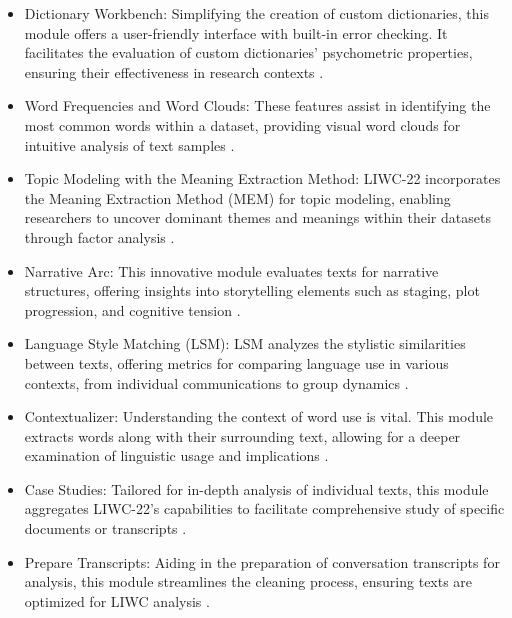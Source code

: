 \begin{itemize}
\item Dictionary Workbench: Simplifying the creation of custom dictionaries, this module offers a user-friendly interface with built-in error checking. It facilitates the evaluation of custom dictionaries' psychometric properties, ensuring their effectiveness in research contexts \cite{boyd2022development}.

\item Word Frequencies and Word Clouds: These features assist in identifying the most common words within a dataset, providing visual word clouds for intuitive analysis of text samples \cite{boyd2022development}.

\item Topic Modeling with the Meaning Extraction Method: LIWC-22 incorporates the Meaning Extraction Method (MEM) for topic modeling, enabling researchers to uncover dominant themes and meanings within their datasets through factor analysis \cite{boyd2022development}.

\item Narrative Arc: This innovative module evaluates texts for narrative structures, offering insights into storytelling elements such as staging, plot progression, and cognitive tension \cite{boyd2022development}.

\item Language Style Matching (LSM): LSM analyzes the stylistic similarities between texts, offering metrics for comparing language use in various contexts, from individual communications to group dynamics \cite{boyd2022development}.

\item Contextualizer: Understanding the context of word use is vital. This module extracts words along with their surrounding text, allowing for a deeper examination of linguistic usage and implications \cite{boyd2022development}.

\item Case Studies: Tailored for in-depth analysis of individual texts, this module aggregates LIWC-22's capabilities to facilitate comprehensive study of specific documents or transcripts \cite{boyd2022development}.

\item Prepare Transcripts: Aiding in the preparation of conversation transcripts for analysis, this module streamlines the cleaning process, ensuring texts are optimized for LIWC analysis \cite{boyd2022development}.
\end{itemize}

